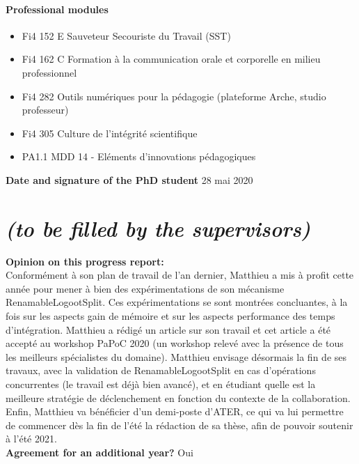 \documentclass[12pt]{article}
\begin{document}
\paragraph{\footnotesize Professional modules}
  \begin{itemize}
      \itemsep0em
      \item Fi4 152 E Sauveteur Secouriste du Travail (SST)
      \item Fi4 162 C Formation à la communication orale et corporelle en milieu professionnel
      \item Fi4 282 Outils numériques pour la pédagogie (plateforme Arche, studio professeur)
      \item Fi4 305 Culture de l’intégrité scientifique
      \item PA1.1 MDD 14 - Eléments d’innovations pédagogiques
  \end{itemize}

\noindent\textbf{Date and signature of the PhD student}
28 mai 2020


\newpage
\section*{ \textit{\small (to be filled by the supervisors)}}

\noindent\textbf{Opinion on this progress report:}\\
Conformément à son plan de travail de l'an dernier, Matthieu a mis à profit cette année pour mener à bien des expérimentations de son mécanisme RenamableLogootSplit.
Ces expérimentations se sont montrées concluantes, à la fois sur les aspects gain de mémoire et sur les aspects performance des temps d'intégration.
Matthieu a rédigé un article sur son travail et cet article a été accepté au workshop PaPoC 2020 (un workshop relevé avec la présence de tous les meilleurs spécialistes du domaine).
Matthieu envisage désormais la fin de ses travaux, avec la validation de RenamableLogootSplit en cas d'opérations concurrentes (le travail est déjà bien avancé), et en étudiant quelle est la meilleure stratégie de déclenchement en fonction du contexte de la collaboration.
Enfin, Matthieu va bénéficier d'un demi-poste d'ATER, ce qui va lui permettre de commencer dès la fin de l'été la rédaction de sa thèse, afin de pouvoir soutenir à l'été 2021.
\\

\noindent\textbf{Agreement for an additional year?}
Oui
\\
\end{document}
